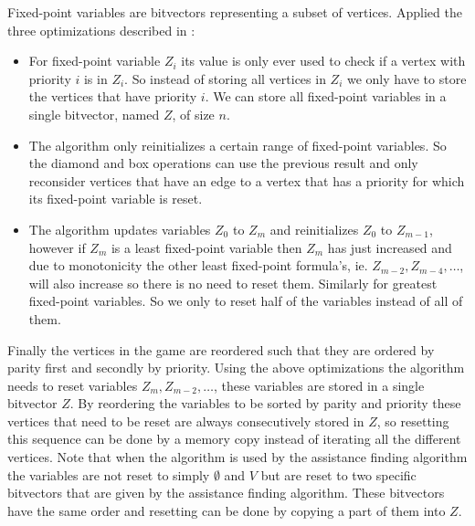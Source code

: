 Fixed-point variables are bitvectors representing a subset of vertices.
Applied the three optimizations described in \cite{FPITE}:
\begin{itemize}
	\item For fixed-point variable $Z_i$ its value is only ever used to check if a vertex with priority $i$ is in $Z_i$. So instead of storing all vertices in $Z_i$ we only have to store the vertices that have priority $i$. We can store all fixed-point variables in a single bitvector, named $Z$, of size $n$.
	\item The algorithm only reinitializes a certain range of fixed-point variables. So the diamond and box operations can use the previous result and only reconsider vertices that have an edge to a vertex that has a priority for which its fixed-point variable is reset.
	\item The algorithm updates variables $Z_0$ to $Z_m$ and reinitializes $Z_0$ to $Z_{m-1}$, however if $Z_m$ is a least fixed-point variable then $Z_m$ has just increased and due to monotonicity the other least fixed-point formula's, ie. $Z_{m-2},Z_{m-4},\dots$, will also increase so there is no need to reset them. Similarly for greatest fixed-point variables. So we only to reset half of the variables instead of all of them.
\end{itemize}
Finally the vertices in the game are reordered such that they are ordered by parity first and secondly by priority. Using the above optimizations the algorithm needs to reset variables $Z_{m}, Z_{m-2},\dots$, these variables are stored in a single bitvector $Z$. By reordering the variables to be sorted by parity and priority these vertices that need to be reset are always consecutively stored in $Z$, so resetting this sequence can be done by a memory copy instead of iterating all the different vertices. Note that when the algorithm is used by the assistance finding algorithm the variables are not reset to simply $\emptyset$ and $V$ but are reset to two specific bitvectors that are given by the assistance finding algorithm. These bitvectors have the same order and resetting can be done by copying a part of them into $Z$.